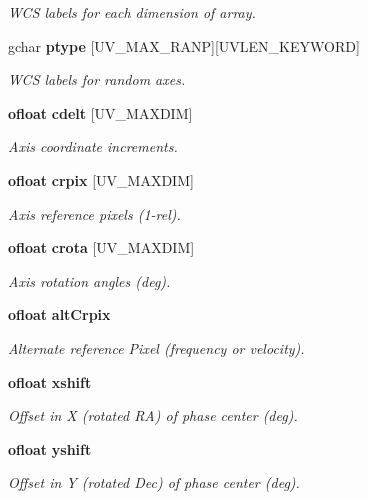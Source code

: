 \begin{CompactItemize}
\begin{CompactList}\small\item\em WCS labels for each dimension of array. \item\end{CompactList}\item 
gchar {\bf ptype} [UV\_\-MAX\_\-RANP][UVLEN\_\-KEYWORD]
\begin{CompactList}\small\item\em WCS labels for random axes. \item\end{CompactList}\item 
{\bf ofloat} {\bf cdelt} [UV\_\-MAXDIM]
\begin{CompactList}\small\item\em Axis coordinate increments. \item\end{CompactList}\item 
{\bf ofloat} {\bf crpix} [UV\_\-MAXDIM]
\begin{CompactList}\small\item\em Axis reference pixels (1-rel). \item\end{CompactList}\item 
{\bf ofloat} {\bf crota} [UV\_\-MAXDIM]
\begin{CompactList}\small\item\em Axis rotation angles (deg). \item\end{CompactList}\item 
{\bf ofloat} {\bf alt\-Crpix}
\begin{CompactList}\small\item\em Alternate reference Pixel (frequency or velocity). \item\end{CompactList}\item 
{\bf ofloat} {\bf xshift}
\begin{CompactList}\small\item\em Offset in X (rotated RA) of phase center (deg). \item\end{CompactList}\item 
{\bf ofloat} {\bf yshift}
\begin{CompactList}\small\item\em Offset in Y (rotated Dec) of phase center (deg). \item\end{CompactList}\item 

\end{CompactItemize}

